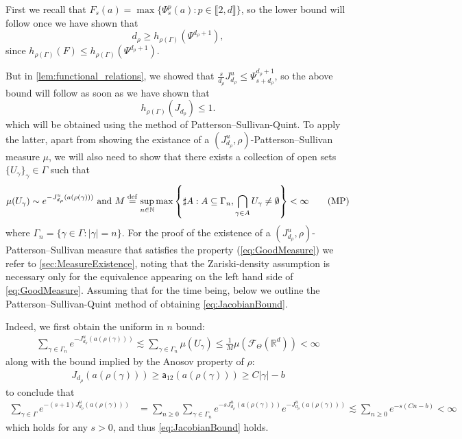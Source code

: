 \documentclass{report}
\begin{document}
First we recall that $F_s(a) = \max \{ \Psi_s^p(a) : p \in \llbracket 2, d \rrbracket\}$,
so the lower bound will follow once we have shown that
$$d_\rho \geq h_{\rho(\Gamma)}(\Psi^{d_\rho + 1}),$$
since $h_{\rho(\Gamma)}(F) \leq h_{\rho(\Gamma)}(\Psi^{d_\rho + 1})$.

But in \cref{lem:functional_relations}, we showed that $\frac{s}{d_\rho} J_{d_\rho}^u \leq \Psi_{s+d_\rho}^{d_\rho + 1}$, so the above bound will follow as soon as we have shown that
\begin{equation}\label{eq:JacobianBound}
    h_{\rho(\Gamma)}(J_{d_\rho}) \leq 1.\tag{LB}
\end{equation}
which will be obtained using the method of Patterson--Sullivan-Quint.
To apply the latter, apart from showing the existance of a $(J_{d_\rho}^u, \rho)$-Patterson--Sullivan measure $\mu$, we will also need to show that there exists a collection of open sets $\{U_\gamma\}_\gamma \in \Gamma$ such that
\begin{align*}\label{eq:GoodMeasure}
    \mu(U_\gamma) \sim e^{-J_{d_\rho}^u(a(\rho(\gamma)))} \text{ and } 
    M \overset{\mathrm{def}}{=} \sup_{n \in \mathbb N}
    \max
    \left\{\sharp A : A \subseteq \Gamma_n,  \bigcap_{\gamma \in A}U_\gamma \neq \emptyset \right\} < \infty\tag{MP}
\end{align*}
where $\Gamma_n = \{ \gamma \in \Gamma : |\gamma| = n \} $.
For the proof of the existence of a $(J_{d_\rho}^u, \rho)$-Patterson--Sullivan measure that satisfies the property (\ref{eq:GoodMeasure}) we refer to \cref{sec:MeasureExistence}, noting that the Zariski-density assumption is necessary only for the equivalence appearing on the left hand side of \cref{eq:GoodMeasure}.
Assuming that for the time being, below we outline the Patterson--Sullivan-Quint method of obtaining \cref{eq:JacobianBound}.

Indeed, we first obtain the uniform in $n$ bound:
\begin{align*}
    \sum_{\gamma \in \Gamma_n}
    e^{-J_{d_\rho}^u(a(\rho(\gamma)))} \lesssim
    \sum_{\gamma \in \Gamma_n}
    \mu(U_\gamma) \leq \frac{1}{M} \mu(\mathcal F_\Theta(\mathbb R^d)) < \infty
\end{align*}
along with the bound implied by the Anosov property of $\rho$:
\begin{align*}
J_{d_\rho}(a(\rho(\gamma))) \geq \mathsf a_{12} (a(\rho(\gamma))) \geq C|\gamma| - b
\end{align*}
to conclude that
\begin{align*}
\sum_{\gamma \in \Gamma} e^{-(s+1)J^u_{d_\rho}(a(\rho(\gamma)))} &=
\sum_{n\geq 0} \sum_{\gamma \in \Gamma_n} e^{-s J^u_{d_\rho}(a(\rho(\gamma)))}
    e^{-J^u_{d_\rho}(a(\rho(\gamma)))} \lesssim
\sum_{n\geq 0} e^{-s(Cn - b)} < \infty
\end{align*}
which holds for any $s>0$, and thus \cref{eq:JacobianBound} holds.
\end{document}
